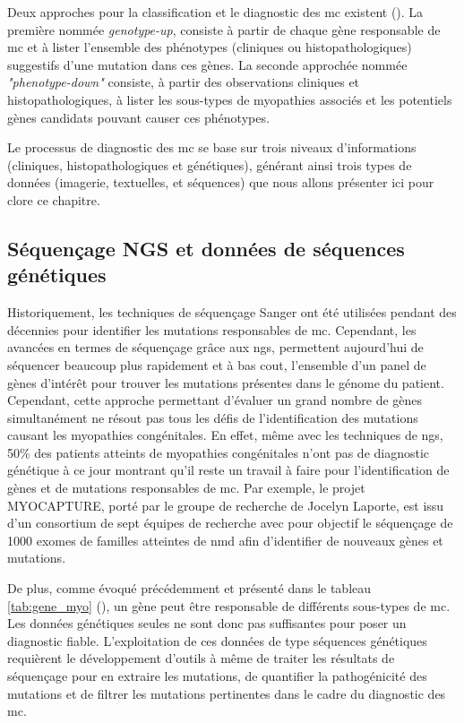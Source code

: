 Deux approches pour la classification et le diagnostic des \gls{mc} existent (\cite{north_approach_2014}). La première nommée \textit{genotype-up}, consiste à partir de chaque gène responsable de \gls{mc} et à lister l'ensemble des phénotypes (cliniques ou histopathologiques) suggestifs d'une mutation dans ces gènes. La seconde approchée nommée \textit{"phenotype-down"} consiste, à partir des observations cliniques et histopathologiques, à lister les sous-types de myopathies associés et les potentiels gènes candidats pouvant causer ces phénotypes.

Le processus de diagnostic des \gls{mc} se base sur trois niveaux d'informations (cliniques, histopathologiques et génétiques), générant ainsi trois types de données (imagerie, textuelles, et séquences) que nous allons présenter ici pour clore ce chapitre.

\subsection{Séquençage NGS et données de séquences génétiques}
Historiquement, les techniques de séquençage Sanger ont été utilisées pendant des décennies pour identifier les mutations responsables de \gls{mc}. Cependant, les avancées en termes de séquençage grâce aux \gls{ngs}, permettent aujourd'hui de séquencer beaucoup plus rapidement et à bas cout, l'ensemble d'un panel de gènes d'intérêt pour trouver les mutations présentes dans le génome du patient. Cependant, cette approche permettant d'évaluer un grand nombre de gènes simultanément ne résout pas tous les défis de l'identification des mutations causant les myopathies congénitales. En effet, même avec les techniques de \gls{ngs}, 50\% des patients atteints de myopathies congénitales n'ont pas de diagnostic génétique à ce jour montrant qu'il reste un travail à faire pour l'identification de gènes et de mutations responsables de \gls{mc}. Par exemple, le projet MYOCAPTURE, porté par le groupe de recherche de Jocelyn Laporte, est issu d'un consortium de sept équipes de recherche avec pour objectif le séquençage de 1000 exomes de familles atteintes de \gls{nmd} afin d'identifier de nouveaux gènes et mutations.

De plus, comme évoqué précédemment et présenté dans le tableau \ref{tab:gene_myo} (\cite{cassandrini_congenital_2017}), un gène peut être responsable de différents sous-types de \gls{mc}. Les données génétiques seules ne sont donc pas suffisantes pour poser un diagnostic fiable. L'exploitation de ces données de type séquences génétiques requièrent le développement d'outils à même de traiter les résultats de séquençage pour en extraire les mutations, de quantifier la pathogénicité des mutations et de filtrer les mutations pertinentes dans le cadre du diagnostic des \gls{mc}. 

